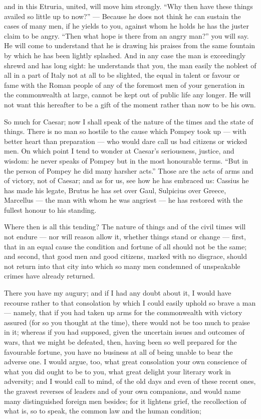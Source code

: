  and in this Etruria, united, will move him strongly. ``Why then have these things availed so little up to now?'' --- Because he does not think he can sustain the cases of many men, if he yields to you, against whom he holds he has the juster claim to be angry. ``Then what hope is there from an angry man?'' you will say. He will come to understand that he is drawing his praises from the same fountain by which he has been lightly splashed. And in any case the man is exceedingly shrewd and has long sight: he understands that you, the man easily the noblest of all in a part of Italy not at all to be slighted, the equal in talent or favour or fame with the Roman people of any of the foremost men of your generation in the commonwealth at large, cannot be kept out of public life any longer. He will not want this hereafter to be a gift of the moment rather than now to be his own.

 So much for Caesar; now I shall speak of the nature of the times and the state of things. There is no man so hostile to the cause which Pompey took up --- with better heart than preparation --- who would dare call us bad citizens or wicked men. On which point I tend to wonder at Caesar's seriousness, justice, and wisdom: he never speaks of Pompey but in the most honourable terms. ``But in the person of Pompey he did many harsher acts.'' Those are the acts of arms and of victory, not of Caesar; and as for us, see how he has embraced us: Cassius he has made his legate, Brutus he has set over Gaul, Sulpicius over Greece, Marcellus --- the man with whom he was angriest --- he has restored with the fullest honour to his standing.

 Where then is all this tending? The nature of things and of the civil times will not endure --- nor will reason allow it, whether things stand or change --- first, that in an equal cause the condition and fortune of all should not be the same; and second, that good men and good citizens, marked with no disgrace, should not return into that city into which so many men condemned of unspeakable crimes have already returned.

 There you have my augury; and if I had any doubt about it, I would have recourse rather to that consolation by which I could easily uphold so brave a man --- namely, that if you had taken up arms for the commonwealth with victory assured (for so you thought at the time), there would not be too much to praise in it; whereas if you had supposed, given the uncertain issues and outcomes of wars, that we might be defeated, then, having been so well prepared for the favourable fortune, you have no business at all of being unable to bear the adverse one. I would argue, too, what great consolation your own conscience of what you did ought to be to you, what great delight your literary work in adversity; and I would call to mind, of the old days and even of these recent ones, the gravest reverses of leaders and of your own companions, and would name many distinguished foreign men besides; for it lightens grief, the recollection of what is, so to speak, the common law and the human condition;

